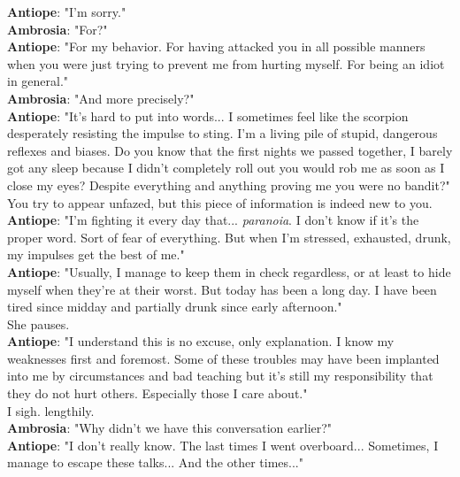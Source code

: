\documentclass{report}
\newcommand{\speaker}[1]{
	\textbf{#1}: 
}
\begin{document}
\speaker{Antiope} "I'm sorry."\\

\speaker{Ambrosia} "For?"\\

\speaker{Antiope} "For my behavior. For having attacked you in all possible manners when you were just trying to prevent me from hurting myself. For being an idiot in general."\\

\speaker{Ambrosia} "And more precisely?"\\

\speaker{Antiope} "It's hard to put into words... I sometimes feel like the scorpion desperately resisting the impulse to sting. I'm a living pile of stupid, dangerous reflexes and biases. Do you know that the first nights we passed together, I barely got any sleep because I didn't completely roll out you would rob me as soon as I close my eyes? Despite everything and anything proving me you were no bandit?"\\

You try to appear unfazed, but this piece of information is indeed new to you.\\

\speaker{Antiope} "I'm fighting it every day that... \emph{paranoia}. I don't know if it's the proper word. Sort of fear of everything. But when I'm stressed, exhausted, drunk, my impulses get the best of me."\\

\speaker{Antiope} "Usually, I manage to keep them in check regardless, or at least to hide myself when they're at their worst. But today has been a long day. I have been tired since midday and partially drunk since early afternoon."\\

She pauses.\\

\speaker{Antiope} "I understand this is no excuse, only explanation. I know my weaknesses first and foremost. Some of these troubles may have been implanted into me by circumstances and bad teaching but it's still my responsibility that they do not hurt others. Especially those I care about."\\

I sigh. lengthily.\\

\speaker{Ambrosia} "Why didn't we have this conversation earlier?"\\

\speaker{Antiope} "I don't really know. The last times I went overboard... Sometimes, I manage to escape these talks... And the other times..."\\
\end{document}
